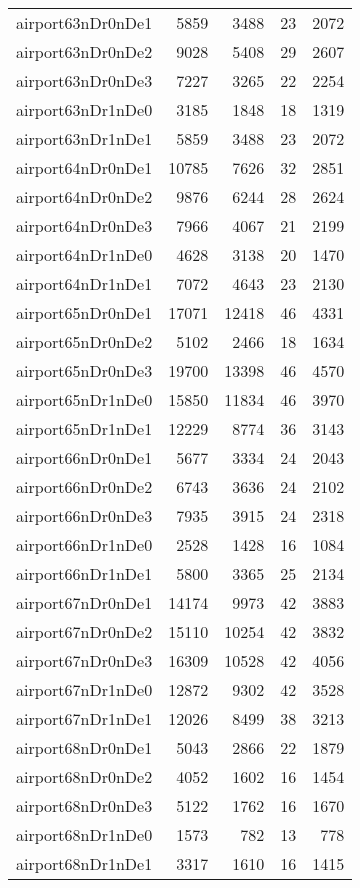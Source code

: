 \begin{longtable}{lrrrr}
airport63nDr0nDe1 & 5859 & 3488 & 23 & 2072 \\
airport63nDr0nDe2 & 9028 & 5408 & 29 & 2607 \\
airport63nDr0nDe3 & 7227 & 3265 & 22 & 2254 \\
airport63nDr1nDe0 & 3185 & 1848 & 18 & 1319 \\
airport63nDr1nDe1 & 5859 & 3488 & 23 & 2072 \\
airport64nDr0nDe1 & 10785 & 7626 & 32 & 2851 \\
airport64nDr0nDe2 & 9876 & 6244 & 28 & 2624 \\
airport64nDr0nDe3 & 7966 & 4067 & 21 & 2199 \\
airport64nDr1nDe0 & 4628 & 3138 & 20 & 1470 \\
airport64nDr1nDe1 & 7072 & 4643 & 23 & 2130 \\
airport65nDr0nDe1 & 17071 & 12418 & 46 & 4331 \\
airport65nDr0nDe2 & 5102 & 2466 & 18 & 1634 \\
airport65nDr0nDe3 & 19700 & 13398 & 46 & 4570 \\
airport65nDr1nDe0 & 15850 & 11834 & 46 & 3970 \\
airport65nDr1nDe1 & 12229 & 8774 & 36 & 3143 \\
airport66nDr0nDe1 & 5677 & 3334 & 24 & 2043 \\
airport66nDr0nDe2 & 6743 & 3636 & 24 & 2102 \\
airport66nDr0nDe3 & 7935 & 3915 & 24 & 2318 \\
airport66nDr1nDe0 & 2528 & 1428 & 16 & 1084 \\
airport66nDr1nDe1 & 5800 & 3365 & 25 & 2134 \\
airport67nDr0nDe1 & 14174 & 9973 & 42 & 3883 \\
airport67nDr0nDe2 & 15110 & 10254 & 42 & 3832 \\
airport67nDr0nDe3 & 16309 & 10528 & 42 & 4056 \\
airport67nDr1nDe0 & 12872 & 9302 & 42 & 3528 \\
airport67nDr1nDe1 & 12026 & 8499 & 38 & 3213 \\
airport68nDr0nDe1 & 5043 & 2866 & 22 & 1879 \\
airport68nDr0nDe2 & 4052 & 1602 & 16 & 1454 \\
airport68nDr0nDe3 & 5122 & 1762 & 16 & 1670 \\
airport68nDr1nDe0 & 1573 & 782 & 13 & 778 \\
airport68nDr1nDe1 & 3317 & 1610 & 16 & 1415 \\

\end{longtable}
